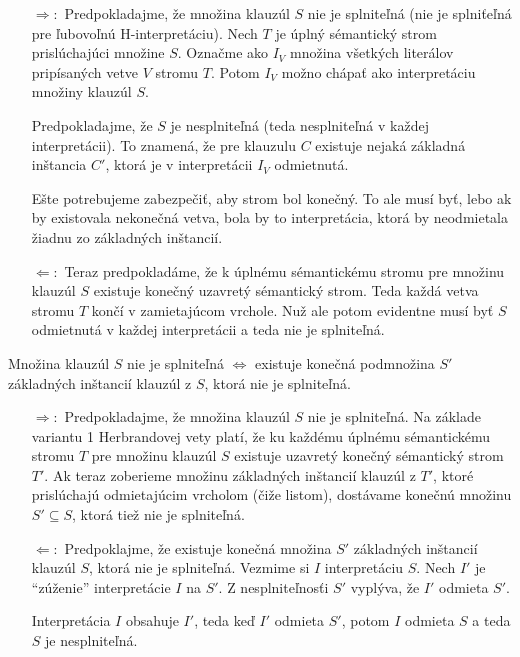 \begin{dokaz}
    \noindent
    \begin{itemize}
    \item[$\Rightarrow:$] Predpokladajme, že množina klauzúl $S$
        nie je splniteľná (nie je splniťeľná pre ľubovoľnú
        H-interpretáciu).
        Nech $T$ je úplný sémantický strom prislúchajúci množine $S$.
        Označme ako $I_V$ množina všetkých literálov
        pripísaných vetve $V$ stromu $T$.
        Potom $I_V$ možno chápať ako interpretáciu množiny klauzúl $S$.

        Predpokladajme, že $S$ je nesplniteľná
        (teda nesplniteľná v každej interpretácii).
        To znamená, že pre klauzulu $C$ existuje nejaká
        základná inštancia $C'$, ktorá je v interpretácii $I_V$ odmietnutá.

        Ešte potrebujeme zabezpečiť, aby strom bol konečný.
        To ale musí byť, lebo ak by existovala nekonečná vetva,
        bola by to interpretácia, ktorá by neodmietala žiadnu zo
        základných inštancií.

    \item[$\Leftarrow:$] Teraz predpokladáme,
        že k úplnému sémantickému stromu pre množinu klauzúl $S$
        existuje konečný uzavretý sémantický strom.
        Teda každá vetva stromu $T$ končí v zamietajúcom vrchole.
        Nuž ale potom evidentne musí byť $S$ odmietnutá v každej
        interpretácii a teda nie je splniteľná.
    \end{itemize}
\end{dokaz}

\begin{veta}
    Množina klauzúl $S$ nie je splniteľná $\iff$
    existuje konečná podmnožina $S'$ základných inštancií klauzúl z $S$,
    ktorá nie je splniteľná.
\end{veta}

\begin{dokaz}
    \noindent
    \begin{itemize}
    \item[$\Rightarrow:$] Predpokladajme, že množina klauzúl $S$
        nie je splniteľná. Na základe variantu 1 Herbrandovej vety
        platí, že ku každému úplnému sémantickému stromu $T$ pre
        množinu klauzúl $S$ existuje uzavretý konečný sémantický
        strom $T'$. Ak teraz zoberieme množinu základných inštancií
        klauzúl z $T'$, ktoré prislúchajú odmietajúcim vrcholom (čiže
        listom), dostávame konečnú množinu $S' \subseteq S$,
        ktorá tiež nie je splniteľná.

    \item[$\Leftarrow:$] Predpoklajme, že existuje
        konečná množina $S'$ základných inštancií klauzúl $S$,
        ktorá nie je splniteľná.
        Vezmime si $I$ interpretáciu $S$.
        Nech $I'$ je ``zúženie'' interpretácie $I$ na $S'$.
        Z nesplniteľnosťi $S'$ vyplýva, že $I'$ odmieta $S'$.

        Interpretácia $I$ obsahuje $I'$, teda keď $I'$ odmieta $S'$,
        potom $I$ odmieta $S$ a teda $S$ je nesplniteľná.
    \end{itemize}
\end{dokaz}

